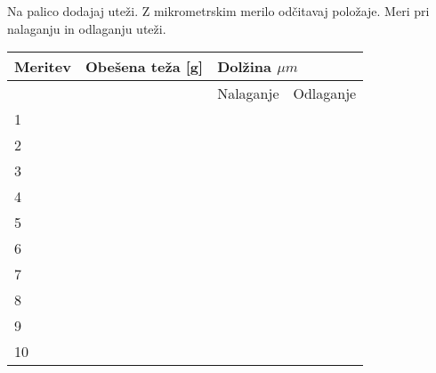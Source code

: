 \documentclass[11pt, a4paper]{article}
\begin{document}
Na palico dodajaj uteži. Z mikrometrskim merilo odčitavaj položaje. Meri pri nalaganju in odlaganju uteži. 
\begin{center}
    \begin{tabular}{|l|l|ll|}
\hline
Meritev & Obešena teža {[}g{]} & \multicolumn{2}{l|}{Dolžina $ \mu m $}               \\ \hline
        &                      & \multicolumn{1}{l|}{Nalaganje} & Odlaganje \\ \hline
1       &                      & \multicolumn{1}{l|}{}          &           \\ \hline
2       &                      & \multicolumn{1}{l|}{}          &           \\ \hline
3       &                      & \multicolumn{1}{l|}{}          &           \\ \hline
4       &                      & \multicolumn{1}{l|}{}          &           \\ \hline
5       &                      & \multicolumn{1}{l|}{}          &           \\ \hline
6       &                      & \multicolumn{1}{l|}{}          &           \\ \hline
7       &                      & \multicolumn{1}{l|}{}          &           \\ \hline
8       &                      & \multicolumn{1}{l|}{}          &           \\ \hline
9       &                      & \multicolumn{1}{l|}{}          &           \\ \hline
10      &                      & \multicolumn{1}{l|}{}          &           \\ \hline
\end{tabular}
\end{center}
\end{document}
